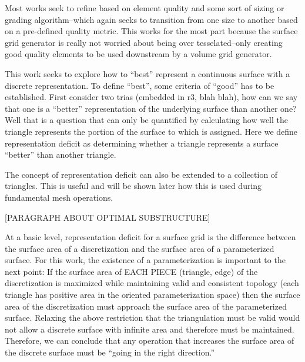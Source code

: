 Most works seek to refine based on element quality and some sort of
sizing or grading algorithm--which again seeks to transition from one
size to another based on a pre-defined quality metric. This works for
the most part because the surface grid generator is really not worried
about being over tesselated--only creating good quality elements to be
used downstream by a volume grid generator.

This work seeks to explore how to ``best'' represent a continuous
surface with a discrete representation. To define ``best'', some
criteria of ``good'' has to be established. First consider two trias
(embedded in r3, blah blah), how can we say that one is a ``better''
representation of the underlying surface than another one? Well that is
a question that can only be quantified by calculating how well the
triangle represents the portion of the surface to which is assigned.
Here we define representation deficit as determining whether a triangle
represents a surface ``better'' than another triangle.

The concept of representation deficit can also be extended to a
collection of triangles. This is useful and will be shown later how this
is used during fundamental mesh operations.

[PARAGRAPH ABOUT OPTIMAL SUBSTRUCTURE]

At a basic level, representation deficit for a surface grid is the
difference between the surface area of a discretization and the surface
area of a parameterized surface. For this work, the existence of a
parameterization is important to the next point: If the surface area of
EACH PIECE (triangle, edge) of the discretization is maximized while
maintaining valid and consistent topology (each triangle has positive
area in the oriented parameterization space) then the surface area
of the discretization must approach the surface area of the
parameterized surface. Relaxing the above restriction that the
triangulation must be valid would not allow a discrete surface with
infinite area and therefore must be maintained. Therefore, we can
conclude that any operation that increases the surface area of the
discrete surface must be ``going in the right direction.''

